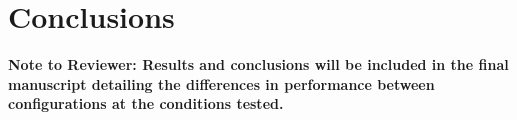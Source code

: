 \section{Conclusions}

\color{red}
\noindent \textbf{Note to Reviewer:  Results and conclusions will be included in the final manuscript detailing the differences in performance between configurations at the conditions tested.}
\color{black}


